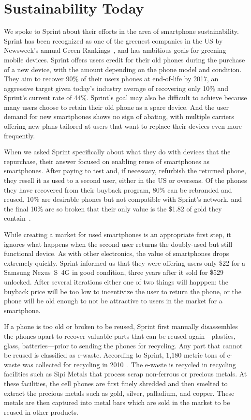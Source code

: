\section{Sustainability Today}
\label{sec-sustainability}

We spoke to Sprint about their efforts in the area of smartphone
sustainability. Sprint has been recognized as one of the greenest companies
in the US by Newsweek's annual Green Rankings~\cite{sprintgreen-url}, and has
ambitious goals for greening mobile devices. Sprint offers users credit for
their old phones during the purchase of a new device, with the amount
depending on the phone model and condition. They aim to recover 90\% of their
users phones at end-of-life by 2017, an aggressive target given today's
industry average of recovering only 10\% and Sprint's current rate of 44\%.
Sprint's goal may also be difficult to achieve because many users choose to
retain their old phone as a spare device. And the user demand for new
smartphones shows no sign of abating, with multiple carriers offering new
plans tailored at users that want to replace their devices even more
frequently.

When we asked Sprint specifically about what they do with devices that the
repurchase, their answer focused on enabling reuse of smartphones as
smartphones. After paying to test and, if necessary, refurbish the returned
phone, they resell it as used to a second user, either in the US or overseas.
Of the phones they have recovered from their buyback program, 80\% can be
rebranded and reused, 10\% are desirable phones but not compatible with
Sprint's network, and the final 10\% are so broken that their only value is
the \$1.82 of gold they contain~\cite{cnn-goldinphone}.

While creating a market for used smartphones is an appropriate first step, it
ignores what happens when the second user returns the doubly-used but still
functional device. As with other electronics, the value of smartphones drops
extremely quickly. Sprint informed us that they were offering users only \$22
for a Samsung Nexus~S~4G in good condition, three years after it sold for
\$529 unlocked. After several iterations either one of two things will
happpen: the buyback price will be too low to incentivize the user to return
the phone, or the phone will be old enough to not be attractive to users in
the market for a smartphone.

If a phone is too old or broken to be reused, Sprint first manually
disassembles the phones apart to recover valuable parts that can be reused
again---plastics, glass, batteries---prior to sending the phones for
recycling. Any part that cannot be reused is classified as e-waste. According
to Sprint, 1,180 metric tons of e-waste was collected for recycling in
2010~\cite{sprintpolicy-url}. The e-waste is recycled in recycling facilities
such as Sipi Metals that process scrap non-ferrous or precious metals. At
these facilities, the cell phones are first finely shredded and then smelted
to extract the precious metals such as gold, silver, palladium, and copper.
These metals are then captured into metal bars which are sold in the market
to be reused in other products.

